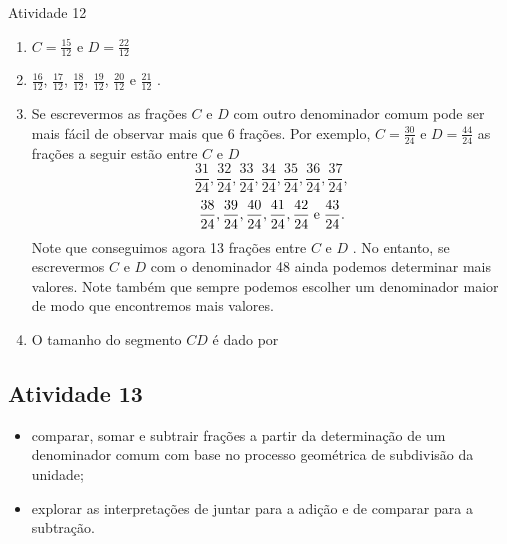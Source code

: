 \begin{multicols}{2}
\begin{resposta*}{Atividade 12}
\begin{enumerate} [\quad a)] %
  \item         $C=\frac{15}{12}$     e     $D=\frac{22}{12}$
  \item         $\frac{16}{12}$,     $\frac{17}{12}$,     $\frac{18}{12}$,     $\frac{19}{12}$,     $\frac{20}{12}$     e     $\frac{21}{12}$    .
  \item     Se escrevermos as frações     $C$     e     $D $     com outro denominador comum pode ser mais fácil de observar mais que 6 frações. Por exemplo,     $C=\frac{30}{24}$     e     $D=\frac{44}{24}$     as frações a seguir estão entre     $C$     e     $D$ $$\frac{31}{24}, \frac{32}{24}, \frac{33}{24}, \frac{34}{24}, \frac{35}{24}, \frac{36}{24}, \frac{37}{24},$$ 
  $$\frac{38}{24}, \frac{39}{24}, \frac{40}{24}, \frac{41}{24}, \frac{42}{24}\; {\rm e }\; \frac{43}{24}.$$     
  Note que conseguimos agora 13 frações entre     $C$     e     $D$    . No entanto, se escrevermos     $C$     e     $D$     com o denominador 48 ainda podemos determinar mais valores. Note também que sempre podemos escolher um denominador maior de modo que encontremos mais valores. 
  \item     O tamanho do segmento     $CD$     é dado por 
\end{enumerate} %
\end{resposta*}

\clearpage


\subsection{Atividade 13}

  \newline \vspace{.15cm}  

  \begin{itemize} %
    \item       comparar, somar e subtrair frações a partir da determinação de um denominador comum com base no processo geométrica de subdivisão da unidade;
    \item       explorar as interpretações de juntar para a adição e de comparar para a subtração.
\end{itemize} %
  
  
   \vspace{.15cm}  


\end{multicols}
